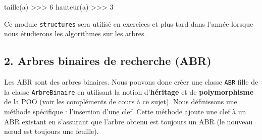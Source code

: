 \documentclass[
  letterpaper,
  DIV=11,
  numbers=noendperiod]{scrartcl}
\newenvironment{Shaded}{\begin{snugshade}}{\end{snugshade}}
\newcommand{\DecValTok}[1]{\textcolor[rgb]{0.68,0.00,0.00}{#1}}
\newcommand{\NormalTok}[1]{\textcolor[rgb]{0.00,0.23,0.31}{#1}}
\newcommand{\OperatorTok}[1]{\textcolor[rgb]{0.37,0.37,0.37}{#1}}
\begin{document}
\begin{Shaded}
\begin{Highlighting}[]
\NormalTok{taille(a)}
\OperatorTok{\textgreater{}\textgreater{}\textgreater{}} \DecValTok{6}
\NormalTok{hauteur(a)}
\OperatorTok{\textgreater{}\textgreater{}\textgreater{}} \DecValTok{3}
\end{Highlighting}
\end{Shaded}

Ce module \texttt{structures} sera utilisé en exercices et plus tard
dans l'année lorsque nous étudierons les algorithmes sur les arbres.

\hypertarget{arbres-binaires-de-recherche-abr}{%
\subsection{2. Arbres binaires de recherche
(ABR)}\label{arbres-binaires-de-recherche-abr}}

Les ABR sont des arbres binaires. Nous pouvons donc créer une classe
\texttt{ABR} fille de la classe \texttt{ArbreBinaire} en utilisant la
notion d'\textbf{héritage} et de \textbf{polymorphisme} de la POO (voir
les compléments de cours à ce sujet). Nous définissons une méthode
spécifique : l'insertion d'une clef. Cette méthode ajoute une clef à un
ABR existant en s'assurant que l'arbre obtenu est toujours un ABR (le
nouveau nœud est toujours une feuille).
\end{document}
